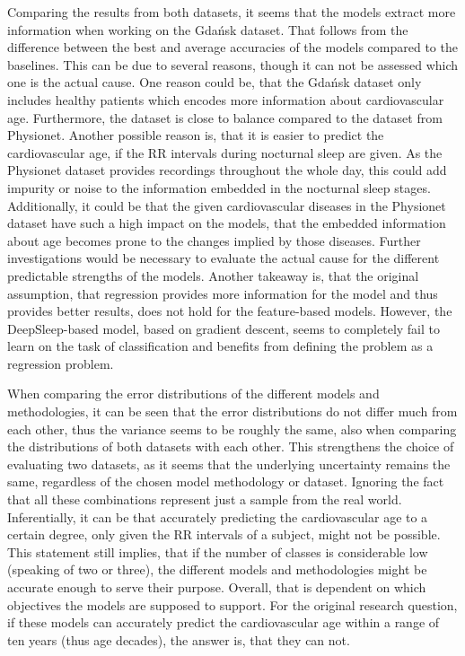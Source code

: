 \documentclass[11pt]{scrartcl}
\begin{document}
Comparing the results from both datasets, it seems that the models extract more information when working on the Gdańsk dataset. That follows from the difference between the best and average accuracies of the models compared to the baselines. This can be due to several reasons, though it can not be assessed which one is the actual cause. One reason could be, that the Gdańsk dataset only includes healthy patients which encodes more information about cardiovascular age. Furthermore, the dataset is close to balance compared to the dataset from Physionet. Another possible reason is, that it is easier to predict the cardiovascular age, if the RR intervals during nocturnal sleep are given. As the Physionet dataset provides recordings throughout the whole day, this could add impurity or noise to the information embedded in the nocturnal sleep stages. Additionally, it could be that the given cardiovascular diseases in the Physionet dataset have such a high impact on the models, that the embedded information about age becomes prone to the changes implied by those diseases. Further investigations would be necessary to evaluate the actual cause for the different predictable strengths of the models. Another takeaway is, that the original assumption, that regression provides more information for the model and thus provides better results, does not hold for the feature-based models. However, the DeepSleep-based model, based on gradient descent, seems to completely fail to learn on the task of classification and benefits from defining the problem as a regression problem.

When comparing the error distributions of the different models and methodologies, it can be seen that the error distributions do not differ much from each other, thus the variance seems to be roughly the same, also when comparing the distributions of both datasets with each other. This strengthens the choice of evaluating two datasets, as it seems that the underlying uncertainty remains the same, regardless of the chosen model methodology or dataset. Ignoring the fact that all these combinations represent just a sample from the real world. Inferentially, it can be that accurately predicting the cardiovascular age to a certain degree, only given the RR intervals of a subject, might not be possible. This statement still implies, that if the number of classes is considerable low (speaking of two or three), the different models and methodologies might be accurate enough to serve their purpose. Overall, that is dependent on which objectives the models are supposed to support. For the original research question, if these models can accurately predict the cardiovascular age within a range of ten years (thus age decades), the answer is, that they can not.
\end{document}
